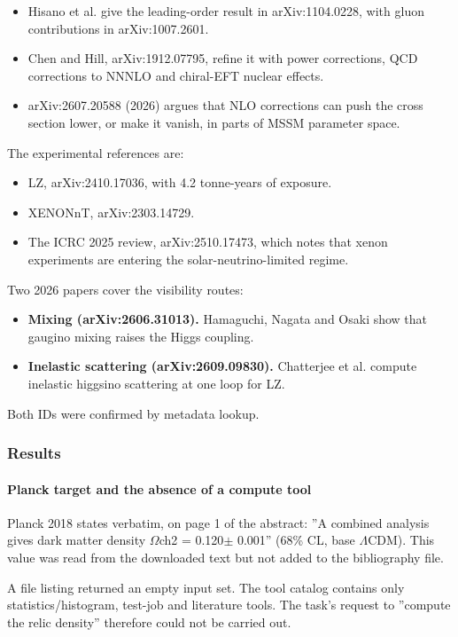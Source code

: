 \documentclass[11pt,a4paper]{article}
\begin{document}
\begin{itemize}
  \item Hisano et al. give the leading-order result in arXiv:1104.0228, with gluon contributions in arXiv:1007.2601.
  \item Chen and Hill, arXiv:1912.07795, refine it with power corrections, QCD corrections to NNNLO and chiral-EFT nuclear effects.
  \item arXiv:2607.20588 (2026) argues that NLO corrections can push the cross section lower, or make it vanish, in parts of MSSM parameter space.
\end{itemize}
The experimental references are:

\begin{itemize}
  \item LZ, arXiv:2410.17036, with 4.2 tonne-years of exposure.
  \item XENONnT, arXiv:2303.14729.
  \item The ICRC 2025 review, arXiv:2510.17473, which notes that xenon experiments are entering the solar-neutrino-limited regime.
\end{itemize}
Two 2026 papers cover the visibility routes:

\begin{itemize}
  \item \textbf{Mixing (arXiv:2606.31013).} Hamaguchi, Nagata and Osaki show that gaugino mixing raises the Higgs coupling.
  \item \textbf{Inelastic scattering (arXiv:2609.09830).} Chatterjee et al. compute inelastic higgsino scattering at one loop for LZ.
\end{itemize}
Both IDs were confirmed by metadata lookup.

\subsubsection*{Results}
\paragraph{Planck target and the absence of a compute tool}
Planck 2018 states verbatim, on page 1 of the abstract: ''A combined analysis gives dark matter density $\Omega$ch2 = 0.120$\pm$ 0.001'' (68\% CL, base $\Lambda$CDM). This value was read from the downloaded text but not added to the bibliography file.

A file listing returned an empty input set. The tool catalog contains only statistics/histogram, test-job and literature tools. The task's request to ''compute the relic density'' therefore could not be carried out.
\end{document}

